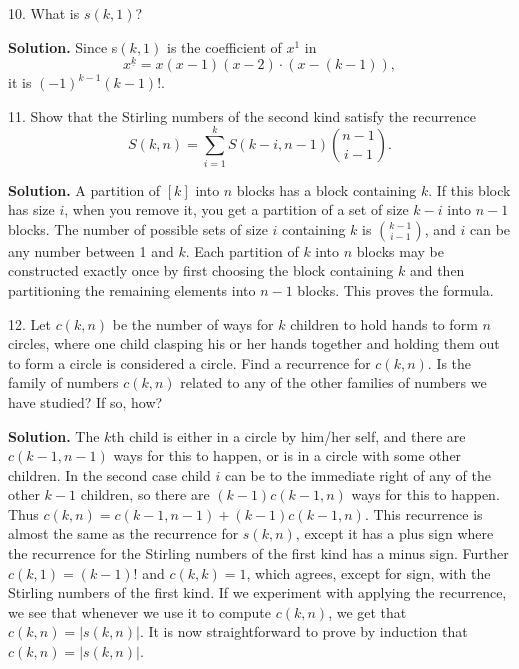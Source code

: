 \documentclass[10pt,]{book}
\theoremstyle{plain}
\theoremstyle{definition}
\theoremstyle{definition}
\numberwithin{equation}{chapter}
\begin{document}
\begin{exerciselist}
\item[10.]\hypertarget{exercise-32}{}What is \(s(k,1)\)?%
\par\smallskip
\par\smallskip
\noindent\textbf{Solution.}\hypertarget{solution-278}{}\quad
Since s\((k,1)\) is the coefficient of \(x^1\) in%
\begin{equation*}
x^{\underline{k}} = x(x-1)
(x-2)\cdot (x-(k-1)),
\end{equation*}
it is \((-1)^{k-1}(k-1)!\).%
\item[11.]\hypertarget{exercise-33}{}Show that the Stirling numbers of the second kind satisfy the recurrence%
\begin{equation*}
S(k,n) = \sum_{i=1}^kS(k-i,n-1)\binom{n-1}{i-1}\text{.}
\end{equation*}
%
\par\smallskip
\par\smallskip
\noindent\textbf{Solution.}\hypertarget{solution-279}{}\quad
A partition of \([k]\) into \(n\) blocks has a block containing \(k\). If this block has size \(i\), when you remove it, you get a partition of a set of size \(k-i\) into \(n-1\) blocks. The number of possible sets of size \(i\) containing \(k\) is \(\binom{k-1}{i-1}\), and \(i\) can be any number between 1 and \(k\). Each partition of \(k\) into \(n\) blocks may be constructed exactly once by first choosing the block containing \(k\) and then partitioning the remaining elements into \(n-1\) blocks. This proves the formula.%
\item[12.]\hypertarget{exercise-34}{}Let \(c(k,n)\) be the number of ways for \(k\) children to hold hands to form \(n\) circles, where one child clasping his or her hands together and holding them out to form a circle is considered a circle.  Find a recurrence for \(c(k,n)\).  Is the family of numbers \(c(k,n)\) related to any of the other families of numbers we have studied? If so, how?%
\par\smallskip
\par\smallskip
\noindent\textbf{Solution.}\hypertarget{solution-280}{}\quad
The \(k\)th child is either in a circle by him/her self, and there are \(c(k-1,n-1)\) ways for this to happen, or is in a circle with some other children. In the second case child \(i\) can be to the immediate right of any of the other \(k-1\) children, so there are \((k-1)c(k-1,n)\) ways for this to happen. Thus \(c(k,n)=c(k-1,n-1)
+(k-1)c(k-1,n)\). This recurrence is almost the same as the recurrence for \(s(k,n)\), except it has a plus sign where the recurrence for the Stirling numbers of the first kind has a minus sign. Further \(c(k,1)=(k-1)!\) and \(c(k,k)=1\), which agrees, except for sign, with the Stirling numbers of the first kind. If we experiment with applying the recurrence, we see that whenever we use it to compute \(c(k,n)\), we get that \(c(k,n)=|s(k,n)|\). It is now straightforward to prove by induction that \(c(k,n)=|s(k,n)|\).%

\end{exerciselist}
\end{document}

